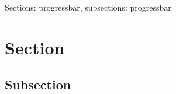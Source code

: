 




\maketitle

\START
\showoutput

\begin{frame}[c]
  Sections: progressbar, subsections: progressbar
\end{frame}

\section{Section}

\subsection{Subsection}


